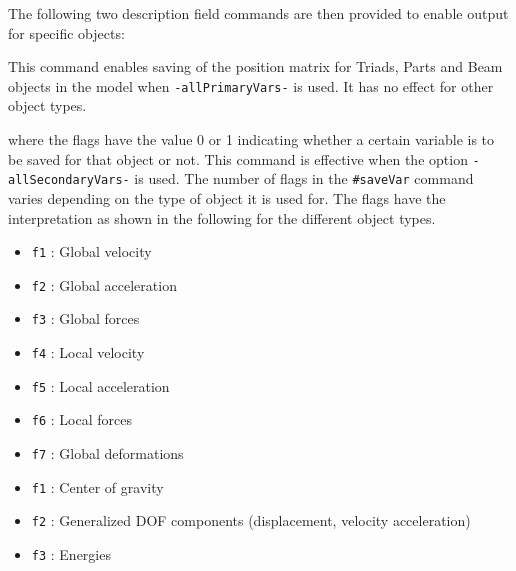 The following two description field commands are then provided to enable
output for specific objects:


\noindent
This command enables saving of the position matrix for Triads, Parts and
Beam objects in the model when {\tt-allPrimaryVars-} is used.
It has no effect for other object types.


\noindent
where the {\tt{}} flags have the value 0 or 1 indicating whether
a certain variable is to be saved for that object or not.
This command is effective when the option {\tt-allSecondaryVars-} is used.
The number of flags in the {\tt\#saveVar} command varies depending on the type
of object it is used for. The flags have the interpretation as shown in the
following for the different object types.




\begin{itemize}
\item{\tt f1} : Global velocity
\item{\tt f2} : Global acceleration
\item{\tt f3} : Global forces
\item{\tt f4} : Local velocity
\item{\tt f5} : Local acceleration
\item{\tt f6} : Local forces
\item{\tt f7} : Global deformations
\end{itemize}




\begin{itemize}
\item{\tt f1} : Center of gravity
\item{\tt f2} : Generalized DOF components (displacement, velocity acceleration)
\item{\tt f3} : Energies
\end{itemize}




